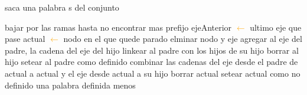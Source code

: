 \begin{algorithm}[H]
\caption{saca una palabra s del conjunto}
\begin{algorithmic}[1]
\STATE bajar por las ramas hasta no encontrar mas prefijo
\STATE ejeAnterior \textcolor{orange}{$\leftarrow$} ultimo eje que pase
\STATE actual \textcolor{orange}{$\leftarrow$} nodo en el que quede parado
		\STATE elminar nodo y eje
		 \STATE {}
		\STATE agregar al eje del padre, la cadena del eje del hijo
		\STATE linkear al padre con los hijos de su hijo
		\STATE borrar al hijo
		\STATE setear al padre como definido
		\ENDIF
	\ELSE
		\STATE {}
		\STATE combinar las cadenas del eje desde el padre de actual a actual y el eje desde actual a su hijo 
		\STATE borrar actual
		\ELSE
				\STATE {}
				\STATE setear actual como no definido
		\ENDIF
	\ENDIF
	\STATE una palabra definida menos
\end{algorithmic}
\end{algorithm}		